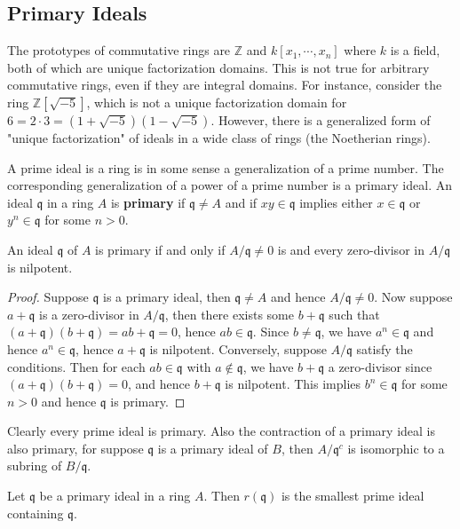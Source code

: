 \subsection{Primary Ideals}
The prototypes of commutative rings are $\mathbb{Z}$ and $k[x_1,\cdots,x_n]$ where $k$ is a field, both of which are unique factorization domains. This is not true for arbitrary commutative rings, even if they are integral domains. For instance, consider the ring $\mathbb{Z}[\sqrt{-5}]$, which is not a unique factorization domain for $6=2\cdot 3=(1+\sqrt{-5})(1-\sqrt{-5})$. However, there is a generalized form of "unique factorization" of ideals in a wide class of rings (the Noetherian rings).\par
A prime ideal is a ring is in some sense a generalization of a prime number. The corresponding generalization of a power of a prime number is a primary ideal. An ideal $\mathfrak{q}$ in a ring $A$ is \textbf{primary} if $\mathfrak{q}\ne A$ and if $xy\in\mathfrak{q}$ implies either $x\in\mathfrak{q}$ or $y^n\in\mathfrak{q}$ for some $n>0$.
\begin{proposition}
An ideal $\mathfrak{q}$ of $A$ is primary if and only if $A/\mathfrak{q}\ne 0$ is and every zero-divisor in $A/\mathfrak{q}$ is nilpotent.
\end{proposition}
\begin{proof}
Suppose $\mathfrak{q}$ is a primary ideal, then $\mathfrak{q}\ne A$ and hence $A/\mathfrak{q}\ne 0$. Now suppose $a+\mathfrak{q}$ is a zero-divisor in $A/\mathfrak{q}$, then there exists some $b+\mathfrak{q}$ such that $(a+\mathfrak{q})(b+\mathfrak{q})=ab+\mathfrak{q}=0$, hence $ab\in\mathfrak{q}$. Since $b\ne\mathfrak{q}$, we have $a^n\in\mathfrak{q}$ and hence $a^n\in\mathfrak{q}$, hence $a+\mathfrak{q}$ is nilpotent. Conversely, suppose $A/\mathfrak{q}$ satisfy the conditions. Then for each $ab\in\mathfrak{q}$ with $a\notin\mathfrak{q}$, we have $b+\mathfrak{q}$ a zero-divisor since $(a+\mathfrak{q})(b+\mathfrak{q})=0$, and hence $b+\mathfrak{q}$ is nilpotent. This implies $b^n\in\mathfrak{q}$ for some $n>0$ and hence $\mathfrak{q}$ is primary.
\end{proof}
Clearly every prime ideal is primary. Also the contraction of a primary ideal is also primary, for suppose $\mathfrak{q}$ is a primary ideal of $B$, then $A/\mathfrak{q}^c$ is isomorphic to a subring of $B/\mathfrak{q}$.
\begin{proposition}
Let $\mathfrak{q}$ be a primary ideal in a ring $A$. Then $r(\mathfrak{q})$ is the smallest prime ideal containing $\mathfrak{q}$.
\end{proposition}

